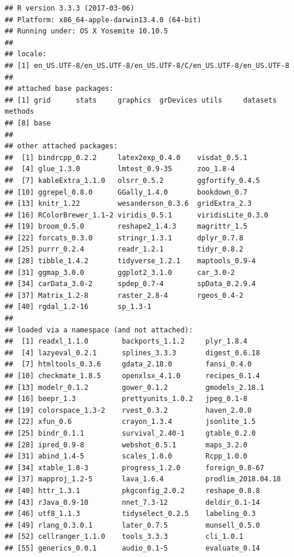 \documentclass[12pt,a4paper,oneside, openany]{book}
\theoremstyle{definition}
\theoremstyle{definition}
\theoremstyle{definition}
\theoremstyle{remark}
\begin{document}
\begin{verbatim}
## R version 3.3.3 (2017-03-06)
## Platform: x86_64-apple-darwin13.4.0 (64-bit)
## Running under: OS X Yosemite 10.10.5
## 
## locale:
## [1] en_US.UTF-8/en_US.UTF-8/en_US.UTF-8/C/en_US.UTF-8/en_US.UTF-8
## 
## attached base packages:
## [1] grid      stats     graphics  grDevices utils     datasets  methods  
## [8] base     
## 
## other attached packages:
##  [1] bindrcpp_0.2.2     latex2exp_0.4.0    visdat_0.5.1      
##  [4] glue_1.3.0         lmtest_0.9-35      zoo_1.8-4         
##  [7] kableExtra_1.1.0   olsrr_0.5.2        ggfortify_0.4.5   
## [10] ggrepel_0.8.0      GGally_1.4.0       bookdown_0.7      
## [13] knitr_1.22         wesanderson_0.3.6  gridExtra_2.3     
## [16] RColorBrewer_1.1-2 viridis_0.5.1      viridisLite_0.3.0 
## [19] broom_0.5.0        reshape2_1.4.3     magrittr_1.5      
## [22] forcats_0.3.0      stringr_1.3.1      dplyr_0.7.8       
## [25] purrr_0.2.4        readr_1.2.1        tidyr_0.8.2       
## [28] tibble_1.4.2       tidyverse_1.2.1    maptools_0.9-4    
## [31] ggmap_3.0.0        ggplot2_3.1.0      car_3.0-2         
## [34] carData_3.0-2      spdep_0.7-4        spData_0.2.9.4    
## [37] Matrix_1.2-8       raster_2.8-4       rgeos_0.4-2       
## [40] rgdal_1.2-16       sp_1.3-1          
## 
## loaded via a namespace (and not attached):
##  [1] readxl_1.1.0        backports_1.1.2     plyr_1.8.4         
##  [4] lazyeval_0.2.1      splines_3.3.3       digest_0.6.18      
##  [7] htmltools_0.3.6     gdata_2.18.0        fansi_0.4.0        
## [10] checkmate_1.8.5     openxlsx_4.1.0      recipes_0.1.4      
## [13] modelr_0.1.2        gower_0.1.2         gmodels_2.18.1     
## [16] beepr_1.3           prettyunits_1.0.2   jpeg_0.1-8         
## [19] colorspace_1.3-2    rvest_0.3.2         haven_2.0.0        
## [22] xfun_0.6            crayon_1.3.4        jsonlite_1.5       
## [25] bindr_0.1.1         survival_2.40-1     gtable_0.2.0       
## [28] ipred_0.9-8         webshot_0.5.1       maps_3.2.0         
## [31] abind_1.4-5         scales_1.0.0        Rcpp_1.0.0         
## [34] xtable_1.8-3        progress_1.2.0      foreign_0.8-67     
## [37] mapproj_1.2-5       lava_1.6.4          prodlim_2018.04.18 
## [40] httr_1.3.1          pkgconfig_2.0.2     reshape_0.8.8      
## [43] rJava_0.9-10        nnet_7.3-12         deldir_0.1-14      
## [46] utf8_1.1.3          tidyselect_0.2.5    labeling_0.3       
## [49] rlang_0.3.0.1       later_0.7.5         munsell_0.5.0      
## [52] cellranger_1.1.0    tools_3.3.3         cli_1.0.1          
## [55] generics_0.0.1      audio_0.1-5         evaluate_0.14      

\end{verbatim}
\end{document}
